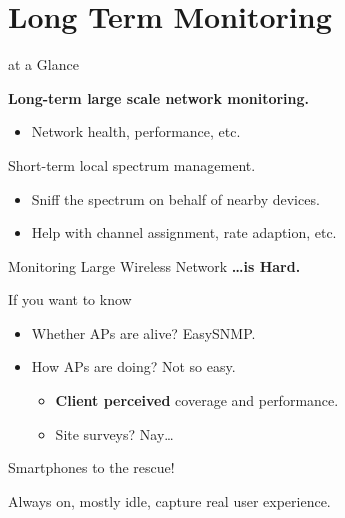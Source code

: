 \section{Long Term Monitoring}

\begin{frame}{\PS{} at a Glance}
  \begin{figure}
    \centering
  \end{figure}
  \textbf{Long-term large scale network monitoring.}
  \begin{itemize}
    \item Network health, performance, etc.
  \end{itemize}
  \color{gray}
  Short-term local spectrum management.
  \begin{itemize}
    \item \color{gray} Sniff the spectrum on behalf of nearby devices.
    \item Help with channel assignment, rate adaption, etc.
  \end{itemize}
\end{frame}


\begin{frame}{\Large Monitoring {\Huge Large} Wireless Network}
  \huge\textbf{\ldots is Hard.}\normalsize
  \begin{block}{If you want to know}
    \begin{itemize}
      \item Whether APs are alive? Easy\textendash SNMP.
      \item How APs are doing? Not so easy.
        \begin{itemize}
          \item \textbf{Client perceived} coverage and performance.
          \item Site surveys? Nay\ldots
        \end{itemize}
    \end{itemize}
  \end{block}
  \huge Smartphones to the rescue!

  \large
  Always on, mostly idle, capture real user experience.
\end{frame}

